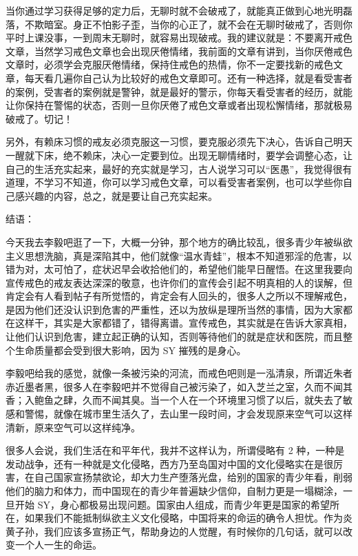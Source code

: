 \documentclass[fontset=founder]{ctexart}
\begin{document}
当你通过学习获得足够的定力后，无聊时就不会破戒了，就能真正做到心地光明磊落，不欺暗室。身正不怕影子歪，当你的心正了，就不会在无聊时破戒了，否则你平时上课没事，一到周末无聊时，就容易出现破戒。我的建议就是：不要离开戒色文章，当然学习戒色文章也会出现厌倦情绪，我前面的文章有讲到，当你厌倦戒色文章时，必须学会克服厌倦情绪，保持住戒色的热情，你不一定要找新的戒色文章，每天看几遍你自己认为比较好的戒色文章即可。还有一种选择，就是看受害者的案例，受害者的案例就是警钟，就是最好的警示，你每天看受害者的经历，就能让你保持在警惕的状态，否则一旦你厌倦了戒色文章或者出现松懈情绪，那就极易破戒了。切记！

另外，有赖床习惯的戒友必须克服这一习惯，要克服必须先下决心，告诉自己明天一醒就下床，绝不赖床，决心一定要到位。出现无聊情绪时，要学会调整心态，让自己的生活充实起来，最好的充实就是学习，古人说学习可以“医愚”，我觉得很有道理，不学习不知道，你可以学习戒色文章，可以看受害者案例，也可以学些你自己感兴趣的内容，总之，就是要让自己充实起来。

结语：

今天我去李毅吧逛了一下，大概一分钟，那个地方的确比较乱，很多青少年被纵欲主义思想洗脑，真是深陷其中，他们就像“温水青蛙”，根本不知道邪淫的危害，以错为对，太可怕了，症状迟早会收拾他们的，希望他们能早日醒悟。在这里我要向宣传戒色的戒友表达深深的敬意，也许你们的宣传会引起不明真相的人的误解，但肯定会有人看到帖子有所觉悟的，肯定会有人回头的，很多人之所以不理解戒色，是因为他们还没认识到危害的严重性，还以为放纵是理所当然的事情，因为大家都在这样干，其实是大家都错了，错得离谱。宣传戒色，其实就是在告诉大家真相，让他们认识到危害，建立起正确的认知，否则等待他们的就是症状和医院，而且整个生命质量都会受到很大影响，因为 SY 摧残的是身心。

李毅吧给我的感觉，就像一条被污染的河流，而戒色吧则是一泓清泉，所谓近朱者赤近墨者黑，很多人在李毅吧并不觉得自己被污染了，如入芝兰之室，久而不闻其香；入鲍鱼之肆，久而不闻其臭。当一个人在一个环境里习惯了以后，就失去了敏感和警惕，就像在城市里生活久了，去山里一段时间，才会发现原来空气可以这样清新，原来空气可以这样纯净。

很多人会说，我们生活在和平年代，我并不这样认为，所谓侵略有 2 种，一种是发动战争，还有一种就是文化侵略，西方乃至岛国对中国的文化侵略实在是很厉害，在自己国家宣扬禁欲论，却大力生产堕落光盘，给别的国家的青少年看，削弱他们的脑力和体力，而中国现在的青少年普遍缺少信仰，自制力更是一塌糊涂，一旦开始 SY，身心都极易出现问题。国家由人组成，而青少年更是国家的希望所在，如果我们不能抵制纵欲主义文化侵略，中国将来的命运的确令人担忧。作为炎黄子孙，我们应该多宣扬正气，帮助身边的人觉醒，有时候你的几句话，就可以改变一个人一生的命运。
\end{document}
